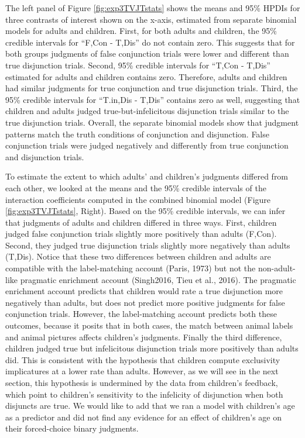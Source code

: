 \documentclass[,man,floatsintext]{apa6}
\begin{document}
The left panel of Figure \ref{fig:exp3TVJTstats} shows the means and 95\% HPDIs for three contrasts of interest shown on the x-axis, estimated from separate binomial models for adults and children. First, for both adults and children, the 95\% credible intervals for \enquote{F,Con - T,Dis} do not contain zero. This suggests that for both groups judgments of false conjunction trials were lower and different than true disjunction trials. Second, 95\% credible intervals for \enquote{T,Con - T,Dis} estimated for adults and children contains zero. Therefore, adults and children had similar judgments for true conjunction and true disjunction trials. Third, the 95\% credible intervals for \enquote{T.in,Dis - T,Dis} contains zero as well, suggesting that children and adults judged true-but-infelicitous disjunction trials similar to the true disjunction trials. Overall, the separate binomial models show that judgment patterns match the truth conditions of conjunction and disjunction. False conjunction trials were judged negatively and differently from true conjunction and disjunction trials.

To estimate the extent to which adults' and children's judgments differed from each other, we looked at the means and the 95\% credible intervals of the interaction coefficients computed in the combined binomial model (Figure \ref{fig:exp3TVJTstats}, Right). Based on the 95\% credible intervals, we can infer that judgments of adults and children differed in three ways. First, children judged false conjunction trials slightly more positively than adults (F,Con). Second, they judged true disjunction trials slightly more negatively than adults (T,Dis). Notice that these two differences between children and adults are compatible with the label-matching account (Paris, 1973) but not the non-adult-like pragmatic enrichment account (Singh2016, Tieu et al., 2016). The pragmatic enrichment account predicts that children would rate a true disjunction more negatively than adults, but does not predict more positive judgments for false conjunction trials. However, the label-matching account predicts both these outcomes, because it posits that in both cases, the match between animal labels and animal pictures affects children's judgments. Finally the third difference, children judged true but infelicitous disjunction trials more positively than adults did. This is consistent with the hypothesis that children compute exclusivity implicatures at a lower rate than adults. However, as we will see in the next section, this hypothesis is undermined by the data from children's feedback, which point to children's sensitivity to the infelicity of disjunction when both disjuncts are true. We would like to add that we ran a model with children's age as a predictor and did not find any evidence for an effect of children's age on their forced-choice binary judgments.
\end{document}
